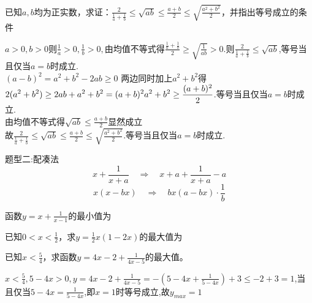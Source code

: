 \documentclass[11pt,a4paper]{ctexbook}
\begin{document}
\par
\begin{problem}
    已知$a,b$均为正实数，求证：$\displaystyle \frac{2}{\frac{1}{a}+\frac{1}{b}}\le\sqrt{ab}\le\frac{a+b}{2}\le\sqrt{\frac{a^2+b^2}{2}}$，并指出等号成立的条件
    \begin{jiexi}
        $\displaystyle a>0,b>0\text{则}\frac{1}{a}>0,\frac{1}{b}>0,$由均值不等式得$\displaystyle \frac{\frac{1}{a}+\frac{1}{b}}{2}\ge\sqrt{\frac{1}{ab}}>0.\text{则}\frac{2}{\frac{1}{a}+\frac{1}{b}}\le\sqrt{ab} $,等号当且仅当$a=b$时成立.\\
        $(a-b)^2 = a^2+b^2-2ab \ge 0$
        两边同时加上$a^2+b^2$得$\displaystyle 2(a^2+b^2)\ge 2ab +a^2+b^2=(a+b)^2\\
        a^2+b^2\ge \frac{(a+b)^2}{2} $.等号当且仅当$\displaystyle a=b$时成立.\\
        由均值不等式得$\displaystyle \sqrt{ab}\le\frac{a+b}{2}$显然成立\\
        故$\displaystyle \frac{2}{\frac{1}{a}+\frac{1}{b}}\le\sqrt{ab}\le\frac{a+b}{2}\le\sqrt{\frac{a^2+b^2}{2}}$.等号当且仅当$\displaystyle a=b$时成立.
    \end{jiexi}
\end{problem}



\begin{tcolorbox} 
\centering
题型二:配凑法
\tcblower %
$$x+\frac{1}{x+a} \quad \Rightarrow \quad x+a+\frac{1}{x+a}-a$$
$$x(x-bx) \quad \Rightarrow \quad bx(a-bx)\cdot \frac{1}{b} $$
\end{tcolorbox}


\par
\begin{problem}
    函数$\displaystyle y=x+\frac{1}{x-1}$的最小值为
\end{problem}

\par
\begin{problem}
    已知$\displaystyle 0<x<\frac{1}{2}$，求$\displaystyle y=\frac{1}{2}x(1-2x)$的最大值为
\end{problem}

\par
\begin{problem}
    已知$\displaystyle x<\frac{5}{4}$，求函数$\displaystyle y=4x-2+\frac{1}{4x-5}$的最大值。
    \begin{jiexi}
        $\displaystyle x<\frac{5}{4},5-4x>0,y=4x-2+\frac{1}{4x-5}=-(5-4x+\frac{1}{5-4x})+3\le-2+3=1$,当且仅当$\displaystyle 5-4x=\frac{1}{5-4x}$,即$x=1$时等号成立,故$y_{max}=1$
    \end{jiexi}
\end{problem}
\end{document}
